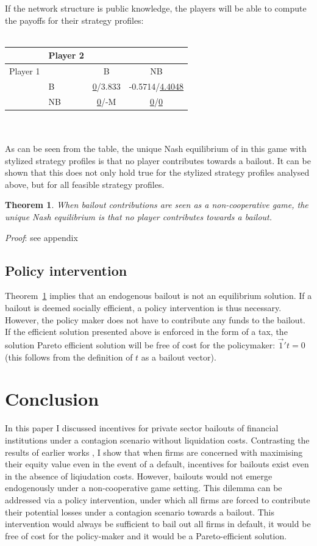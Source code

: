 \documentclass[12pt,a4paper]{article}
\newtheorem{theorem}{Theorem}
\begin{document}
If the network structure is public knowledge, the players will be able to compute the payoffs for their strategy profiles:
\\
\\
\begin{tabular}{|l|l|c|c|}
\hline
 & Player 2 & & \\
\hline
Player 1 & & B & NB \\
\hline
 & B & \underline{0}/3.833 & -0.5714/\underline{4.4048} \\
\hline
 & NB & \underline{0}/-M & \underline{0}/\underline{0} \\
\hline
\end{tabular}
\\
\\

As can be seen from the table, the unique Nash equilibrium of in this game with stylized strategy profiles is that no player contributes towards a bailout. It can be shown that this does not only hold true for the stylized strategy profiles analysed above, but for all feasible strategy profiles.

\begin{theorem} \label{the:equilibrium}
When bailout contributions are seen as a non-cooperative game, the unique Nash equilibrium is that no player contributes towards a bailout.
\end{theorem}

\textit{Proof}: see appendix

\subsection{Policy intervention}
Theorem~\ref{the:equilibrium} implies that an endogenous bailout is not an equilibrium solution. If a bailout is deemed socially efficient, a policy intervention is thus necessary. However, the policy maker does not have to contribute any funds to the bailout. If the efficient solution presented above is enforced in the form of a tax, the solution Pareto efficient solution will be free of cost for the policymaker: $\vec{1}' t=0$ (this follows from the definition of $t$ as a bailout vector).

\section{Conclusion}
In this paper I discussed incentives for private sector bailouts of financial institutions under a contagion scenario without liquidation costs. Contrasting the results of earlier works \cite{Rogers2013}, I show that when firms are concerned with maximising their equity value even in the event of a default, incentives for bailouts exist even in the absence of liqiudation costs. However, bailouts would not emerge endogenously under a non-cooperative game setting. This dilemma can be addressed via a policy intervention, under which all firms are forced to contribute their potential losses under a contagion scenario towards a bailout. This intervention would always be sufficient to bail out all firms in default, it would be free of cost for the policy-maker and it would be a Pareto-efficient solution.
\end{document}
